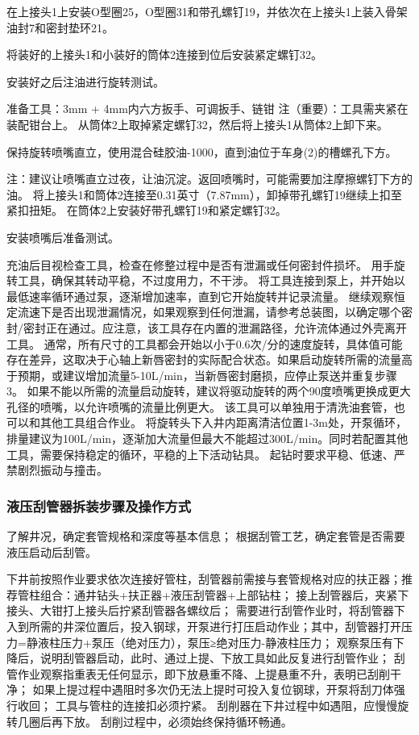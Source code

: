 	在上接头1上安装O型圈25，O型圈31和带孔螺钉19，并依次在上接头1上装入骨架油封7和密封垫环21。
 
	将装好的上接头1和小装好的筒体2连接到位后安装紧定螺钉32。
 
	安装好之后注油进行旋转测试。
	

准备工具：3mm + 4mm内六方扳手、可调扳手、链钳
注（重要）：工具需夹紧在装配钳台上。
	从筒体2上取掉紧定螺钉32，然后将上接头1从筒体2上卸下来。
 
	保持旋转喷嘴直立，使用混合硅胶油-1000，直到油位于车身(2)的槽螺孔下方。
 
注：建议让喷嘴直立过夜，让油沉淀。返回喷嘴时，可能需要加注摩擦螺钉下方的油。
	将上接头1和筒体2连接至0.31英寸（7.87mm），卸掉带孔螺钉19继续上扣至紧扣扭矩。
	在筒体2上安装好带孔螺钉19和紧定螺钉32。
 
	安装喷嘴后准备测试。
	
	充油后目视检查工具，检查在修整过程中是否有泄漏或任何密封件损坏。
	用手旋转工具，确保其转动平稳，不过度用力，不干涉。
	将工具连接到泵上，并开始以最低速率循环通过泵，逐渐增加速率，直到它开始旋转并记录流量。
	继续观察恒定流速下是否出现泄漏情况，如果观察到任何泄漏，请参考总装图，以确定哪个密封/密封正在通过。应注意，该工具存在内置的泄漏路径，允许流体通过外壳离开工具。
	通常，所有尺寸的工具都会开始以小于0.6次/分的速度旋转，具体值可能存在差异，这取决于心轴上新唇密封的实际配合状态。如果启动旋转所需的流量高于预期，或建议增加流量5-10L/min，当新唇密封磨损，应停止泵送并重复步骤3。
	如果不能以所需的流量启动旋转，建议将驱动旋转的两个90度喷嘴更换成更大孔径的喷嘴，以允许喷嘴的流量比例更大。
	该工具可以单独用于清洗油套管，也可以和其他工具组合作业。
	将旋转头下入井内距离清洁位置1-3m处，开泵循环，排量建议为100L/min，逐渐加大流量但最大不能超过300L/min。同时若配置其他工具，需要保持稳定的循环，平稳的上下活动钻具。
	起钻时要求平稳、低速、严禁剧烈振动与撞击。


\subsubsection{液压刮管器拆装步骤及操作方式}

	了解井况，确定套管规格和深度等基本信息；
	根据刮管工艺，确定套管是否需要液压启动后刮管。
	
	下井前按照作业要求依次连接好管柱，刮管器前需接与套管规格对应的扶正器；推荐管柱组合：通井钻头+扶正器+液压刮管器+上部钻柱；
	接上刮管器后，夹紧下接头、大钳打上接头后拧紧刮管器各螺纹后；
	需要进行刮管作业时，将刮管器下入到所需的井深位置后，投入钢球，开泵进行打压启动作业；其中，刮管器打开压力=静液柱压力+泵压（绝对压力），泵压≥绝对压力-静液柱压力；
	观察泵压有下降后，说明刮管器启动，此时、通过上提、下放工具如此反复进行刮管作业；
	刮管作业观察指重表无任何显示，即下放悬重不降、上提悬重不升，表明已刮削干净；
	如果上提过程中遇阻时多次仍无法上提时可投入复位钢球，开泵将刮刀体强行收回；
	工具与管柱的连接扣必须拧紧。
	刮削器在下井过程中如遇阻，应慢慢旋转几圈后再下放。
	刮削过程中，必须始终保持循环畅通。

